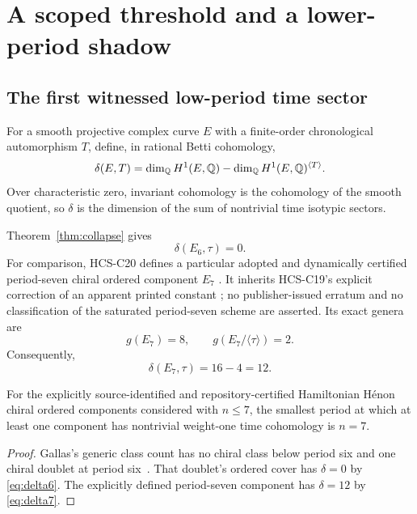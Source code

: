 \section{A scoped threshold and a lower-period shadow}\label{sec:threshold}

\subsection{The first witnessed low-period time sector}

For a smooth projective complex curve $E$ with a finite-order chronological
automorphism $T$, define, in rational Betti cohomology,
\begin{equation}\label{eq:delta-def}
 \delta(E,T)=
 \dim_\mathbb Q H^1(E,\mathbb Q)-\dim_\mathbb Q H^1(E,\mathbb Q)^{\langle T\rangle}.
\end{equation}
Over characteristic zero, invariant cohomology is the cohomology of the
smooth quotient, so $\delta$ is the dimension of the sum of nontrivial time
isotypic sectors.

Theorem~\ref{thm:collapse} gives
\begin{equation}\label{eq:delta6}
 \delta(E_6,\tau)=0.
\end{equation}
For comparison, HCS-C20 defines a particular adopted and dynamically
certified period-seven chiral ordered component $E_7$
\cite[Thms.~1 and~3 and Appendix~A]{hcsc20}.  It inherits HCS-C19's explicit
correction of an apparent printed constant
\cite[Prop.~1, Thm.~2, and Cor.~3]{hcsc19}; no
publisher-issued erratum and no classification of the saturated
period-seven scheme are asserted.  Its exact genera are
\begin{equation}\label{eq:c20-genera}
 g(E_7)=8,
 \qquad
 g(E_7/\langle\tau\rangle)=2.
\end{equation}
Consequently,
\begin{equation}\label{eq:delta7}
 \delta(E_7,\tau)=16-4=12.
\end{equation}

\begin{corollary}\label{cor:threshold}
For the explicitly source-identified and repository-certified Hamiltonian
H\'enon chiral ordered components considered with $n\le7$, the smallest
period at which at least one component has nontrivial weight-one time
cohomology is $n=7$.
\end{corollary}

\begin{proof}
Gallas's generic class count has no chiral class below period six and one
chiral doublet at period six~\cite[Eqs.~(2)--(7) and Table~1]{gallas2007}.
That doublet's ordered cover
has $\delta=0$ by \eqref{eq:delta6}.  The explicitly defined period-seven
component has $\delta=12$ by \eqref{eq:delta7}.
\end{proof}


